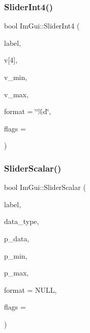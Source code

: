 \subsubsection{\texorpdfstring{Slider\+Int4()}{SliderInt4()}}
{\footnotesize\ttfamily bool Im\+Gui\+::\+Slider\+Int4 (\begin{DoxyParamCaption}\item[{const char $\ast$}]{label,  }\item[{int}]{v\mbox{[}4\mbox{]},  }\item[{int}]{v\+\_\+min,  }\item[{int}]{v\+\_\+max,  }\item[{const char $\ast$}]{format = {\ttfamily \char`\"{}\%d\char`\"{}},  }\item[{Im\+Gui\+Slider\+Flags}]{flags = {} }\end{DoxyParamCaption})}

\mbox{\label{namespaceImGui_afdd7faa9a69f75b8d674cdc207441bea}} 
\subsubsection{\texorpdfstring{Slider\+Scalar()}{SliderScalar()}}
{\footnotesize\ttfamily bool Im\+Gui\+::\+Slider\+Scalar (\begin{DoxyParamCaption}\item[{const char $\ast$}]{label,  }\item[{Im\+Gui\+Data\+Type}]{data\+\_\+type,  }\item[{\hyperlink{imgui__impl__opengl3__loader_8h_ac668e7cffd9e2e9cfee428b9b2f34fa7}{void} $\ast$}]{p\+\_\+data,  }\item[{const \hyperlink{imgui__impl__opengl3__loader_8h_ac668e7cffd9e2e9cfee428b9b2f34fa7}{void} $\ast$}]{p\+\_\+min,  }\item[{const \hyperlink{imgui__impl__opengl3__loader_8h_ac668e7cffd9e2e9cfee428b9b2f34fa7}{void} $\ast$}]{p\+\_\+max,  }\item[{const char $\ast$}]{format = {\ttfamily NULL},  }\item[{Im\+Gui\+Slider\+Flags}]{flags = {} }\end{DoxyParamCaption})}

\mbox{\label{namespaceImGui_a64031a4ad000695c1e1d3f42792f4bb4}} 
